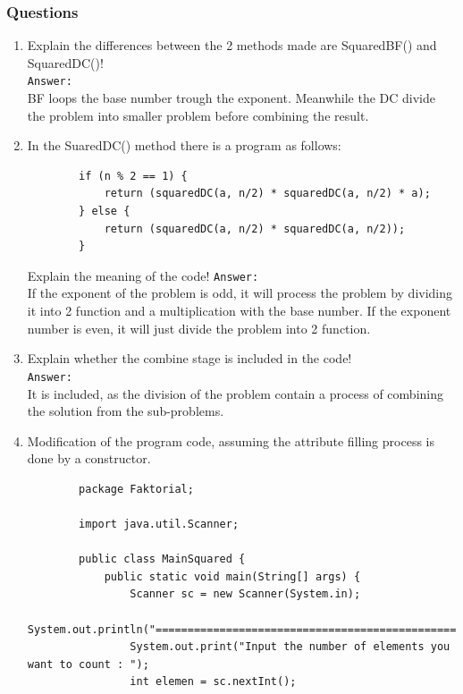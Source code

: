\documentclass[12pt,titlepage]{article}
\begin{document}
\subsubsection{Questions}

\begin{enumerate}
    \item Explain the differences between the 2 methods made are SquaredBF() and SquaredDC()!
    \mbox{}\\
    \texttt{Answer: }
    \mbox{}\\
    BF loops the base number trough the exponent. Meanwhile the DC divide the problem into smaller problem before combining the result.
    \item In the SuaredDC() method there is a program as follows:
    \begin{verbatim}
        if (n % 2 == 1) {
            return (squaredDC(a, n/2) * squaredDC(a, n/2) * a);
        } else {
            return (squaredDC(a, n/2) * squaredDC(a, n/2));
        }
    \end{verbatim}
    Explain the meaning of the code!
    \texttt{Answer: }
    \mbox{}\\
    If the exponent of the problem is odd, it will process the problem by dividing it into 2 function and a multiplication with the base number. If the exponent number is even, it will just divide the problem into 2 function.
    \item Explain whether the combine stage is included in the code!
    \mbox{}\\
    \texttt{Answer: }
    \mbox{}\\
    It is included, as the division of the problem contain a process of combining the solution from the sub-problems.
    \item Modification of the program code, assuming the attribute filling process is done by a constructor.
    \begin{verbatim}
        package Faktorial;

        import java.util.Scanner;

        public class MainSquared {
            public static void main(String[] args) {
                Scanner sc = new Scanner(System.in);
                System.out.println("================================================");
                System.out.print("Input the number of elements you want to count : ");
                int elemen = sc.nextInt();
                

\end{verbatim}
\end{enumerate}
\end{document}
